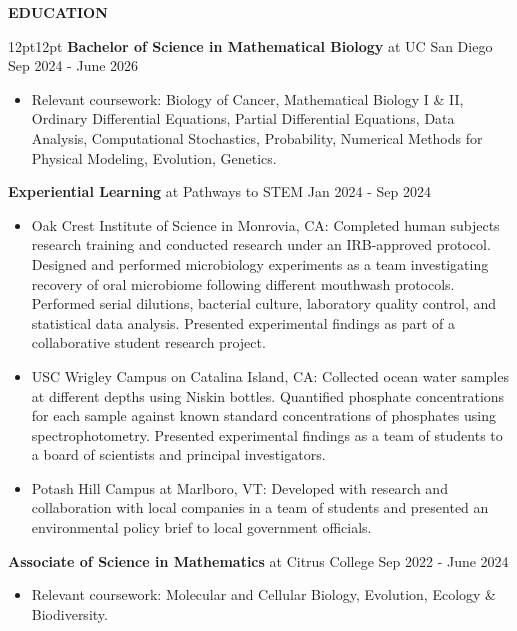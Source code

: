 \documentclass{resumeDaniNguyen}
\begin{document}
\textbf{\large EDUCATION} \xrfill[3pt]{1pt} \\[-6pt]
\begin{adjustwidth}{12pt}{12pt}
    {\large \textbf{Bachelor of Science in Mathematical Biology} at UC San Diego} \hfill Sep 2024 - June 2026
    \begin{itemize}
       \item Relevant coursework: Biology of Cancer, Mathematical Biology I \&
        II, Ordinary Differential Equations, Partial Differential Equations, 
        Data Analysis, Computational Stochastics, Probability,
        Numerical Methods for Physical Modeling, Evolution, Genetics.
    \end{itemize} 

    {\large \textbf{Experiential Learning} at Pathways to STEM} \hfill Jan 2024 - Sep 2024
    \begin{itemize}
        \item Oak Crest Institute of Science in Monrovia, CA: Completed human subjects research 
        training and conducted research under an IRB-approved protocol. Designed and performed 
        microbiology experiments as a team investigating recovery of oral microbiome following 
        different mouthwash protocols. Performed serial dilutions, bacterial culture, laboratory 
        quality control, and statistical data analysis. Presented experimental findings as part 
        of a collaborative student research project. 
        \item USC Wrigley Campus on Catalina Island, CA: Collected ocean water samples at 
        different depths using Niskin bottles. Quantified phosphate concentrations for each sample 
        against known standard concentrations of phosphates using spectrophotometry. Presented 
        experimental findings as a team of students to a board of scientists and principal investigators.
        \item Potash Hill Campus at Marlboro, VT: Developed with research and collaboration with 
        local companies in a team of students and presented an environmental policy brief to 
        local government officials. 
    \end{itemize}

    {\large \textbf{Associate of Science in Mathematics} at Citrus College} \hfill Sep 2022 - June 2024
        \begin{itemize}
            \item Relevant coursework: Molecular and Cellular Biology, Evolution, Ecology \& Biodiversity. \\[-8pt]
        \end{itemize} 
\end{adjustwidth}
\end{document}
